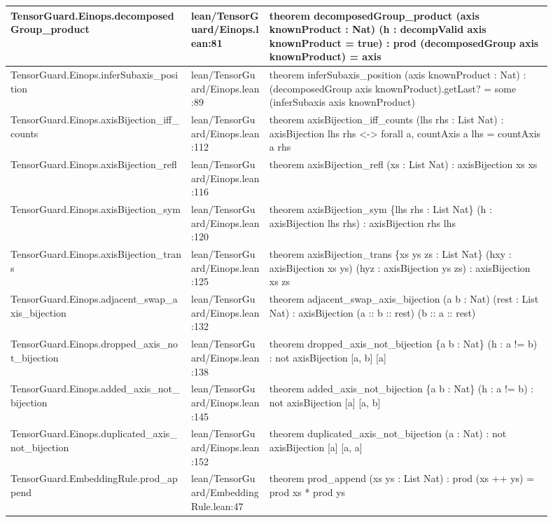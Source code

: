 \documentclass[10pt]{article}
\begin{document}
\begin{longtable}{|p{0.30\linewidth}|p{0.13\linewidth}|p{0.47\linewidth}|}
\hline
TensorGuard.Einops.decomposedGroup\_product & lean/TensorGuard/Einops.lean:81 & theorem decomposedGroup\_product (axis knownProduct : Nat) (h : decompValid axis knownProduct = true) : prod (decomposedGroup axis knownProduct) = axis \\
\hline
TensorGuard.Einops.inferSubaxis\_position & lean/TensorGuard/Einops.lean:89 & theorem inferSubaxis\_position (axis knownProduct : Nat) : (decomposedGroup axis knownProduct).getLast? = some (inferSubaxis axis knownProduct) \\
\hline
TensorGuard.Einops.axisBijection\_iff\_counts & lean/TensorGuard/Einops.lean:112 & theorem axisBijection\_iff\_counts (lhs rhs : List Nat) : axisBijection lhs rhs <-> forall a, countAxis a lhs = countAxis a rhs \\
\hline
TensorGuard.Einops.axisBijection\_refl & lean/TensorGuard/Einops.lean:116 & theorem axisBijection\_refl (xs : List Nat) : axisBijection xs xs \\
\hline
TensorGuard.Einops.axisBijection\_sym & lean/TensorGuard/Einops.lean:120 & theorem axisBijection\_sym \{lhs rhs : List Nat\} (h : axisBijection lhs rhs) : axisBijection rhs lhs \\
\hline
TensorGuard.Einops.axisBijection\_trans & lean/TensorGuard/Einops.lean:125 & theorem axisBijection\_trans \{xs ys zs : List Nat\} (hxy : axisBijection xs ys) (hyz : axisBijection ys zs) : axisBijection xs zs \\
\hline
TensorGuard.Einops.adjacent\_swap\_axis\_bijection & lean/TensorGuard/Einops.lean:132 & theorem adjacent\_swap\_axis\_bijection (a b : Nat) (rest : List Nat) : axisBijection (a :: b :: rest) (b :: a :: rest) \\
\hline
TensorGuard.Einops.dropped\_axis\_not\_bijection & lean/TensorGuard/Einops.lean:138 & theorem dropped\_axis\_not\_bijection \{a b : Nat\} (h : a != b) : not  axisBijection [a, b] [a] \\
\hline
TensorGuard.Einops.added\_axis\_not\_bijection & lean/TensorGuard/Einops.lean:145 & theorem added\_axis\_not\_bijection \{a b : Nat\} (h : a != b) : not  axisBijection [a] [a, b] \\
\hline
TensorGuard.Einops.duplicated\_axis\_not\_bijection & lean/TensorGuard/Einops.lean:152 & theorem duplicated\_axis\_not\_bijection (a : Nat) : not  axisBijection [a] [a, a] \\
\hline
TensorGuard.EmbeddingRule.prod\_append & lean/TensorGuard/EmbeddingRule.lean:47 & theorem prod\_append (xs ys : List Nat) : prod (xs ++ ys) = prod xs * prod ys \\

\end{longtable}
\end{document}
